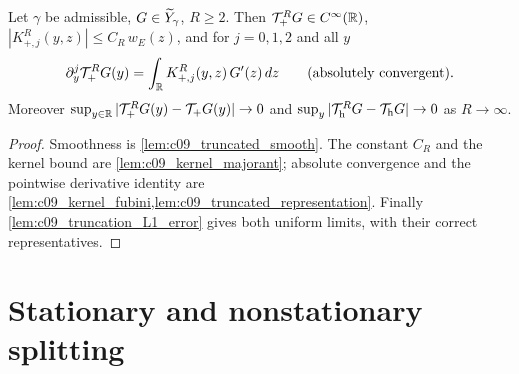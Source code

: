 \begin{lemma}
  \label{lem:c09_kernel_representation}
  Let $\gamma$ be admissible, $G\in\widetilde{Y}_\gamma$, $R\ge2$. Then $\mathcal{T}_+^RG\in C^\infty(\mathbb{R})$, $|K_{+,j}^R(y,z)|\le C_R\,w_E(z)$, and for
  $j=0,1,2$ and all $y$
  \[
    \partial_y^j\mathcal{T}_+^RG(y)=\int_{\mathbb{R}} K_{+,j}^R(y,z)\,G'(z)\,dz\qquad\text{(absolutely convergent).}
  \]
  Moreover $\sup_{y\in\mathbb{R}}|\mathcal{T}_+^RG(y)-\mathcal{T}_+G(y)|\to0$ and $\sup_y|\mathcal{T}_{\textup{h}}^RG-\mathcal{T}_{\textup{h}}G|\to0$ as $R\to\infty$.
\end{lemma}
\begin{proof}
  Smoothness is \cref{lem:c09_truncated_smooth}. The constant $C_R$ and the kernel bound are
  \cref{lem:c09_kernel_majorant}; absolute convergence and the pointwise derivative identity are
  \cref{lem:c09_kernel_fubini,lem:c09_truncated_representation}. Finally
  \cref{lem:c09_truncation_L1_error} gives both uniform limits, with their correct representatives.
\end{proof}

\section{Stationary and nonstationary splitting}

